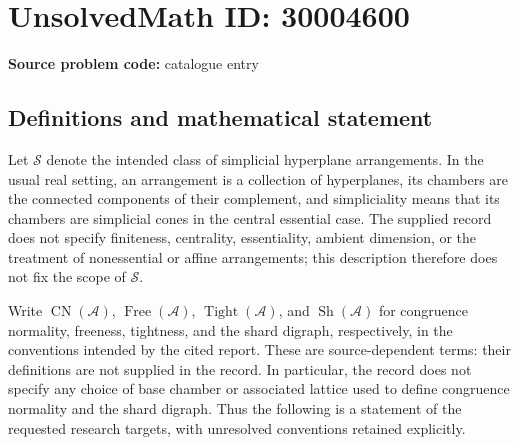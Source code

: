 \documentclass[11pt]{article}
\begin{document}
\section*{UnsolvedMath ID: 30004600}
\textbf{Source problem code:} catalogue entry
\subsection{Definitions and mathematical statement}
Let \(\mathscr S\) denote the intended class of simplicial hyperplane arrangements. In the usual real setting, an arrangement is a collection of hyperplanes, its chambers are the connected components of their complement, and simpliciality means that its chambers are simplicial cones in the central essential case. The supplied record does not specify finiteness, centrality, essentiality, ambient dimension, or the treatment of nonessential or affine arrangements; this description therefore does not fix the scope of \(\mathscr S\).

Write \(\operatorname{CN}(\mathcal A)\), \(\operatorname{Free}(\mathcal A)\), \(\operatorname{Tight}(\mathcal A)\), and \(\operatorname{Sh}(\mathcal A)\) for congruence normality, freeness, tightness, and the shard digraph, respectively, in the conventions intended by the cited report. These are source-dependent terms: their definitions are not supplied in the record. In particular, the record does not specify any choice of base chamber or associated lattice used to define congruence normality and the shard digraph. Thus the following is a statement of the requested research targets, with unresolved conventions retained explicitly.
\end{document}
